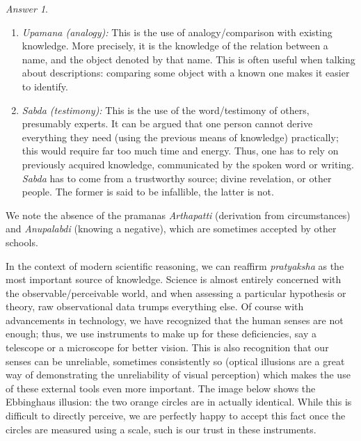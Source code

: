 \documentclass[11pt]{article}
\theoremstyle{remark}
\newtheorem*{answer}{Answer}
\begin{document}
\begin{answer}
\begin{enumerate}
            \item \textit{Upamana (analogy):} This is the use of analogy/comparison
            with existing knowledge. More precisely, it is the knowledge of the
            relation between a name, and the object denoted by that name. This is
            often useful when talking about descriptions: comparing some object with
            a known one makes it easier to identify.

            \item \textit{Sabda (testimony):} This is the use of the word/testimony
            of others, presumably experts. It can be argued that one person cannot
            derive everything they need (using the previous means of knowledge)
            practically; this would require far too much time and energy. Thus, one
            has to rely on previously acquired knowledge, communicated by the spoken
            word or writing. \emph{Sabda} has to come from a trustworthy source;
            divine revelation, or other people. The former is said to be infallible,
            the latter is not.

        \end{enumerate}
        We note the absence of the pramanas \textit{Arthapatti} (derivation from
        circumstances) and \textit{Anupalabdi} (knowing a negative), which are
        sometimes accepted by other schools.

        In the context of modern scientific reasoning, we can reaffirm
        \emph{pratyaksha} as the most important source of knowledge. Science is
        almost entirely concerned with the observable/perceivable world, and when
        assessing a particular hypothesis or theory, raw observational data trumps
        everything else. Of course with advancements in technology, we have
        recognized that the human senses are not enough; thus, we use instruments to
        make up for these deficiencies, say a telescope or a microscope for better
        vision. This is also recognition that our senses can be unreliable, sometimes
        consistently so (optical illusions are a great way of demonstrating the
        unreliability of visual perception) which makes the use of these external
        tools even more important. The image below shows the Ebbinghaus illusion: the
        two orange circles are in actually identical. While this is difficult to
        directly perceive, we are perfectly happy to accept this fact once the
        circles are measured using a scale, such is our trust in these instruments.
        

\end{answer}
\end{document}
